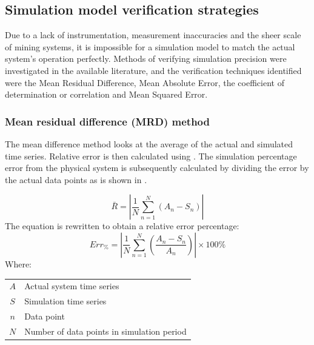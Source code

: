  	\subsection{Simulation model verification strategies}\label{VerificationLit}
 	Due to a lack of instrumentation, measurement inaccuracies and the sheer scale of mining systems, it is impossible for a simulation model to match the actual system's operation perfectly. Methods of verifying simulation precision were investigated in the available literature, and the verification techniques identified were the Mean Residual Difference, Mean Absolute Error, the coefficient of determination or correlation and Mean Squared Error.%
 		\subsubsection{Mean residual difference (MRD) method}
 			The mean difference method looks at the average of the actual and simulated time series. Relative error is then calculated using . The simulation percentage error from the physical system is subsequently calculated by dividing the error by the actual data points as is shown in .
 			
 			\begin{equation}
 			\label{eq: AMean absolute}
 			\bar{R} = \left| \dfrac{1}{N} \sum_{n=1}^{N}{ \left( A_{n} - S_{n}\right)} \right|
 			\end{equation}
The equation is rewritten to obtain a relative error percentage:	
 			\begin{equation}
 				\label{eq: Average difference}
 				Err_{\%} = \left| \dfrac{1}{N} \sum_{n=1}^{N}{ \left(\dfrac{ A_{n} - S_{n}}{A_n}\right)} \right| \times 100 \%
 			\end{equation}
 			Where: \par 
 				\begin{table}[!htbp]
 					\centering
 					\begin{tabular}{cl}
 						$A$ & Actual system time series \\
 						$S$ & Simulation time series \\
 						$n$ & Data point \\
 						$N$ & Number of data points in simulation period \\
 					\end{tabular} 
 				\end{table}	
 			
